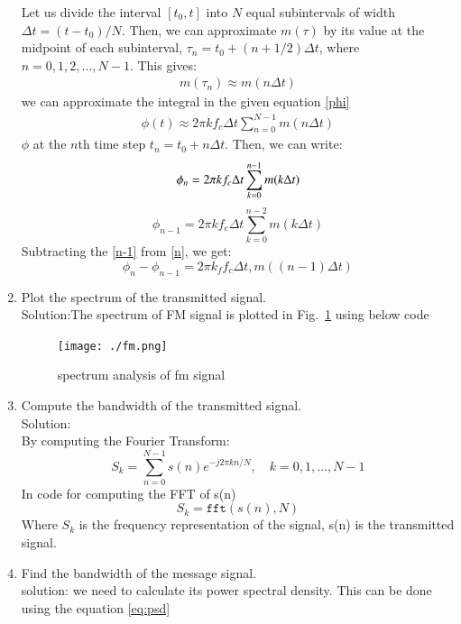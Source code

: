 \documentclass[12pt]{book}
\newcommand\figref{Fig.~\ref}
\begin{document}
\begin{enumerate}
Let us divide the interval $[t_0, t]$ into $N$ equal subintervals of width $\Delta t = (t - t_0)/N$. Then, we can approximate $m(\tau)$ by its value at the midpoint of each subinterval, $\tau_n = t_0 + (n + 1/2)\Delta t$, where $n = 0, 1, 2, ..., N-1$. This gives:
\begin{align*}
m(\tau_n) \approx m(n\Delta t)
\end{align*}
we can approximate the integral in the given equation \ref{phi}
\begin{align*}
\phi(t) \approx 2\pi kf_c \Delta t \sum_{n=0}^{N-1} m(n\Delta t)
\end{align*}
$\phi$ at the $n$th time step $t_n = t_0 + n\Delta t$. Then, we can write:
\begin{equation}
\label{n}
\phi_n = 2\pi kf_c \Delta t \sum_{k=0}^{n-1} m(k\Delta t) \\
\end{equation}
\begin{equation}
\label{n-1}
\phi_{n-1} = 2\pi kf_c \Delta t \sum_{k=0}^{n-2} m(k\Delta t)
\end{equation}
Subtracting the \ref{n-1} from \ref{n}, we get:
\begin{equation}
\phi_n - \phi_{n-1} = 2\pi k_f f_c \Delta t, m((n-1)\Delta t)
\end{equation}
\item Plot the spectrum of the transmitted signal.\\
Solution:\quad The spectrum of FM signal is plotted in \figref{fig:fm_spectrum} using below code


\begin{center}
\end{center}

 \begin{figure}
\centering 
\texttt{[image: ./fm.png]}
\caption{spectrum analysis of fm signal}
\label{fig:fm_spectrum}
\end{figure}

\item Compute the bandwidth of the transmitted signal.\\
Solution:\\By computing the Fourier Transform:
\begin{equation}
S_k = \sum_{n=0}^{N-1} s(n) e^{-j2\pi kn/N}, \quad k=0,1,\dots,N-1
\end{equation}
In code for computing the FFT of s(n)
\begin{equation}
S_k = \texttt{fft}(s(n), N)
\end{equation}
Where $S_k$ is the frequency representation of the signal, s(n) is the transmitted signal. 
\item Find the bandwidth of the message signal.\\
solution: \quad we need to calculate its power spectral density. This can be done using the equation \eqref{eq:psd}


\end{enumerate}
\end{document}
